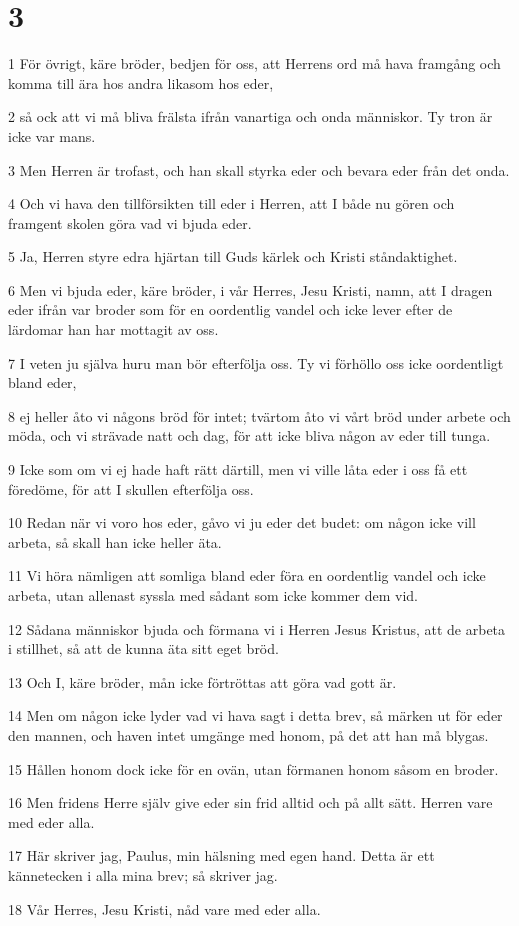 \chapter{3}

\par 1 För övrigt, käre bröder, bedjen för oss, att Herrens ord må hava framgång och komma till ära hos andra likasom hos eder,
\par 2 så ock att vi må bliva frälsta ifrån vanartiga och onda människor. Ty tron är icke var mans.
\par 3 Men Herren är trofast, och han skall styrka eder och bevara eder från det onda.
\par 4 Och vi hava den tillförsikten till eder i Herren, att I både nu gören och framgent skolen göra vad vi bjuda eder.
\par 5 Ja, Herren styre edra hjärtan till Guds kärlek och Kristi ståndaktighet.
\par 6 Men vi bjuda eder, käre bröder, i vår Herres, Jesu Kristi, namn, att I dragen eder ifrån var broder som för en oordentlig vandel och icke lever efter de lärdomar han har mottagit av oss.
\par 7 I veten ju själva huru man bör efterfölja oss. Ty vi förhöllo oss icke oordentligt bland eder,
\par 8 ej heller åto vi någons bröd för intet; tvärtom åto vi vårt bröd under arbete och möda, och vi strävade natt och dag, för att icke bliva någon av eder till tunga.
\par 9 Icke som om vi ej hade haft rätt därtill, men vi ville låta eder i oss få ett föredöme, för att I skullen efterfölja oss.
\par 10 Redan när vi voro hos eder, gåvo vi ju eder det budet: om någon icke vill arbeta, så skall han icke heller äta.
\par 11 Vi höra nämligen att somliga bland eder föra en oordentlig vandel och icke arbeta, utan allenast syssla med sådant som icke kommer dem vid.
\par 12 Sådana människor bjuda och förmana vi i Herren Jesus Kristus, att de arbeta i stillhet, så att de kunna äta sitt eget bröd.
\par 13 Och I, käre bröder, mån icke förtröttas att göra vad gott är.
\par 14 Men om någon icke lyder vad vi hava sagt i detta brev, så märken ut för eder den mannen, och haven intet umgänge med honom, på det att han må blygas.
\par 15 Hållen honom dock icke för en ovän, utan förmanen honom såsom en broder.
\par 16 Men fridens Herre själv give eder sin frid alltid och på allt sätt. Herren vare med eder alla.
\par 17 Här skriver jag, Paulus, min hälsning med egen hand. Detta är ett kännetecken i alla mina brev; så skriver jag.
\par 18 Vår Herres, Jesu Kristi, nåd vare med eder alla.


